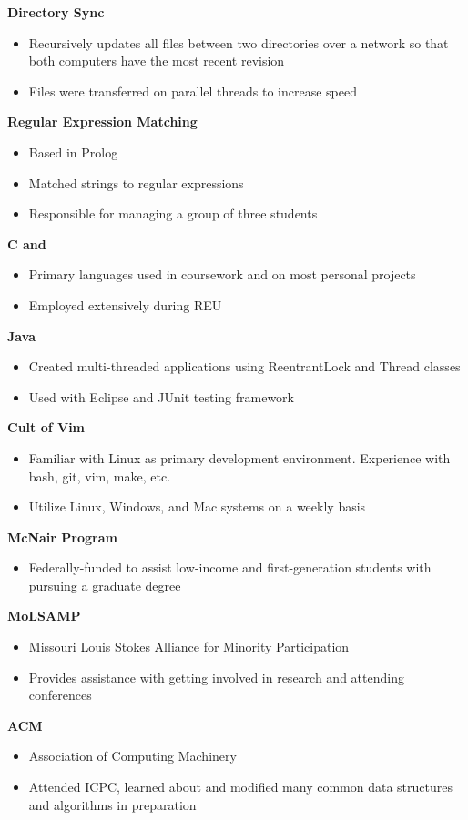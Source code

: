 \textbf{Directory Sync}
\begin{itemize}
	\item Recursively updates all files between two directories over a network so that both computers have the most recent revision
	\item Files were transferred on parallel threads to increase speed
\end{itemize}
\textbf{Regular Expression Matching}
\begin{itemize}
	\item Based in Prolog
	\item Matched strings to regular expressions
	\item Responsible for managing a group of three students
\end{itemize}

\textbf{C and \CC}
\begin{itemize}
	\item Primary languages used in coursework and on most personal projects
	\item Employed extensively during REU
\end{itemize}
\textbf{Java}
\begin{itemize}
\item Created multi-threaded applications using ReentrantLock and Thread classes
\item Used with Eclipse and JUnit testing framework
\end{itemize}
\textbf{Cult of Vim}
\begin{itemize}
\item Familiar with Linux as primary development environment. Experience with bash, git, vim, make, etc.
\item Utilize Linux, Windows, and Mac systems on a weekly basis
\end{itemize}

\textbf{McNair Program}
\begin{itemize}
\item Federally-funded to assist low-income and first-generation students with pursuing a graduate degree
\end{itemize}
\textbf{MoLSAMP}
\begin{itemize}
\item Missouri Louis Stokes Alliance for Minority Participation
\item Provides assistance with getting involved in research and attending conferences
\end{itemize}
\textbf{ACM}
\begin{itemize}
\item Association of Computing Machinery
\item Attended ICPC, learned about and modified many common data structures and algorithms in preparation
\end{itemize}
